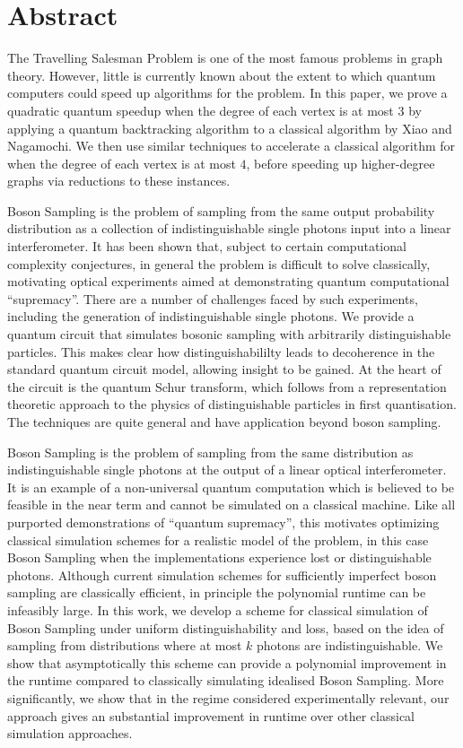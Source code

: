 \chapter*{Abstract}

The Travelling Salesman Problem is one of the most famous problems in graph theory. However, little is currently known about the extent to which quantum computers could speed up algorithms for the problem. In this paper, we prove a quadratic quantum speedup when the degree of each vertex is at most $3$ by applying a quantum backtracking algorithm to a classical algorithm by Xiao and Nagamochi. We then use similar techniques to accelerate a classical algorithm for when the degree of each vertex is at most $4$, before speeding up higher-degree graphs via reductions to these instances.

Boson Sampling is the problem of sampling from the same output probability distribution as a collection of indistinguishable single photons input into a linear interferometer. 
It has been shown that, subject to certain computational complexity conjectures, in general the problem is difficult to solve classically, motivating optical experiments aimed at demonstrating quantum computational ``supremacy''.
There are a number of challenges faced by such experiments, including the generation of indistinguishable single photons.
We provide a quantum circuit that simulates bosonic sampling with arbitrarily distinguishable particles.
This makes clear how distinguishabililty leads to decoherence in the standard quantum circuit model, allowing insight to be gained.
At the heart of the circuit is the quantum Schur transform, which follows from a representation theoretic approach to the physics of distinguishable particles in first quantisation.
The techniques are quite general and have application beyond boson sampling.

Boson Sampling is the problem of sampling from the same distribution as indistinguishable single photons at the output of a linear optical interferometer. 
It is an example of a non-universal quantum computation which is believed to be feasible in the near term and cannot be simulated on a classical machine.
Like all purported demonstrations of ``quantum supremacy'', this motivates optimizing classical simulation schemes for a realistic model of the problem, in this case Boson Sampling when the implementations experience lost or distinguishable photons.
Although current simulation schemes for sufficiently imperfect boson sampling are classically efficient, in principle the polynomial runtime can be infeasibly large.
In this work, we develop a scheme for classical simulation of Boson Sampling under uniform distinguishability and loss, based on the idea of sampling from distributions where at most $k$ photons are indistinguishable.
We show that asymptotically this scheme can provide a polynomial improvement in the runtime compared to classically simulating idealised Boson Sampling. 
More significantly, we show that in the regime considered experimentally relevant, our approach gives an substantial improvement in runtime over other classical simulation approaches.